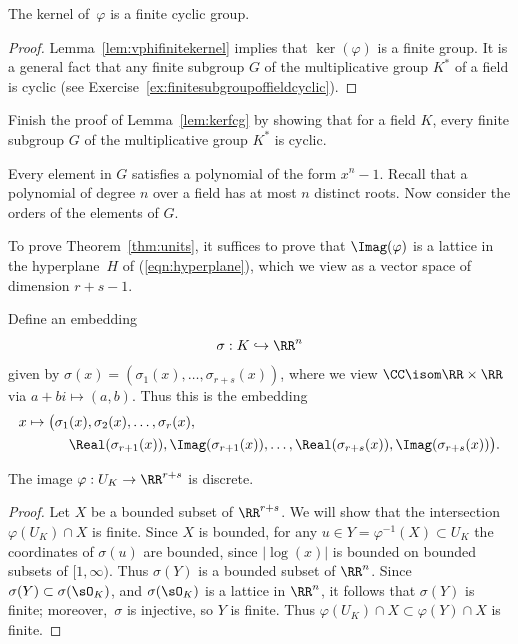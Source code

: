 \begin{lemma}\label{lem:kerfcg}
  The kernel of~$\varphi$ is a finite cyclic group.
\end{lemma}
\begin{proof}
  Lemma~\ref{lem:vphifinitekernel} implies that $\ker(\varphi)$ is a
  finite group.  It is a general fact that any finite subgroup $G$ of
  the multiplicative group $K^*$ of a field is cyclic (see
  Exercise~\ref{ex:finitesubgroupoffieldcyclic}).
\end{proof}

\begin{exercise}\label{ex:finitesubgroupoffieldcyclic}
  Finish the proof of Lemma~\ref{lem:kerfcg}
  by showing that for a field $K$, every finite
  subgroup $G$ of the multiplicative group $K^*$
  is cyclic.

  \begin{hint}
    Every element in $G$ satisfies a polynomial
    of the form $x^n-1$. Recall that a polynomial
    of degree $n$ over a field has at most $n$
    distinct roots. Now consider the orders
    of the elements of $G$.
  \end{hint}
\end{exercise}

To prove Theorem~\ref{thm:units}, it suffices to prove that
$\Imag(\varphi)$ is a lattice in the hyperplane~$H$ of
(\ref{eqn:hyperplane}), which we view as a vector space of dimension
$r+s-1$.

Define an embedding
\begin{equation}\label{eqn:sigma3}
  \sigma : K \hookrightarrow \RR^n
\end{equation}
given by $\sigma(x) = (\sigma_1(x),\dots,\sigma_{r+s}(x))$,
where we view $\CC\isom \RR\times \RR$ via $a+b i\mapsto (a,b)$.
Thus this is the embedding
\begin{align*}
  x\mapsto \big(&\sigma_1(x), \sigma_2(x),\dots, \sigma_r(x), \\
  &\quad \Real(\sigma_{r+1}(x)), \Imag(\sigma_{r+1}(x)),
  \dots, \Real(\sigma_{r+s}(x)), \Imag(\sigma_{r+s}(x))\big).
\end{align*}

\begin{lemma}\label{lem:ukdiscrete}
  The image $\varphi:U_K\to \RR^{r+s}$ is discrete.
\end{lemma}
\begin{proof}
  Let $X$ be a bounded subset of $\RR^{r+s}$.
  We will show that the intersection $\varphi(U_K)\cap X$ is finite.
  Since $X$ is bounded, for any $u\in Y=\varphi^{-1}(X)\subset U_K$ the
  coordinates of $\sigma(u)$ are bounded, since $|\log(x)|$ is bounded on
  bounded subsets of $[1,\infty)$. Thus $\sigma(Y)$ is a bounded subset
  of $\RR^n$.  Since $\sigma(Y)\subset \sigma(\sO_K)$, and $\sigma(\sO_K)$ is
  a lattice in $\RR^n$, it follows that $\sigma(Y)$ is finite;
  moreover,~$\sigma$ is injective, so $Y$ is finite.
  Thus $\varphi(U_K)\cap X \subset \varphi(Y) \cap X$ is finite.
\end{proof}

